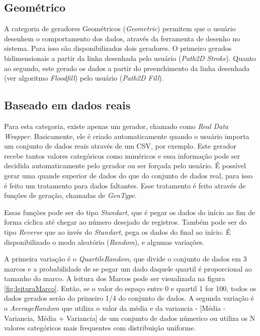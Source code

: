 \documentclass[
	12pt,				%
	openright,			%
	twoside,			%
	a4paper,			%
	english,			%
	brazil				%
	]{abntex2}
\begin{document}
		\subsection{Geométrico}
		A categoria de geradores Geométricos (\emph{Geometric}) permitem que o usuário desenhem o comportamento dos dados, através da ferramenta de desenho no sistema.
		Para isso são disponibilizados dois geradores.
		O primeiro gerados bidimensionais a partir da linha desenhada pelo usuário (\emph{Path2D Stroke}).
		Quanto ao segundo, este gerado os dados a partir do preenchimento da linha desenhada (ver algoritmo \emph{Floodfill}) pelo usuário (\emph{Path2D Fill}).
		\subsection{Baseado em dados reais}
		Para esta categoria, existe apenas um gerador, chamado como \emph{Real Data Wrapper}.
		Basicamente, ele é criado automaticamente quando o usuário importa um conjunto de dados reais através de um CSV, por exemplo.
		Este gerador recebe tantos valores categóricos como numéricos e essa informação pode ser decidida automaticamente pelo gerador ou ser forçada pelo usuário.
		É possível gerar uma quande superior de dados do que do conjunto de dados real, para isso é feito um tratamento para dados faltantes.
		Esse tratamento é feito através de funções de geração, chamadas de \emph{GenType}.
		\par
		Essas funções pode ser do tipo \emph{Standart}, que é pegar os dados do início ao fim de forma cíclica até chegar ao número desejado de registros.
		Também pode ser do tipo \emph{Reverse} que ao invés do \emph{Standart}, pega os dados do final ao início.
		É disponibilizado o modo aleatório (\emph{Random}), e algumas variações.
		\par
		A primeira variação é o \emph{QuartileRandom}, que divide o conjunto de dados em 3 marcos e a probabilidade de se pegar um dado daquele quartil é proporcional ao tamanho do marco.
		A leitura dos Marcos pode ser visualizada na figura \ref{fig:leituraMarco}. Então, se o valor do espaço entre 0 e quartil 1 for 100, todos os dados gerados serão do primeiro 1/4 do conjunto de dados.
		A segunda variação é o \emph{AverageRandom} que utiliza o valor da média e da variancia - [Média - Variancia, Média + Variancia] de um conjunto de dados númerico ou utiliza os N valores categóricos mais frequentes com distribuição uniforme.
\end{document}
